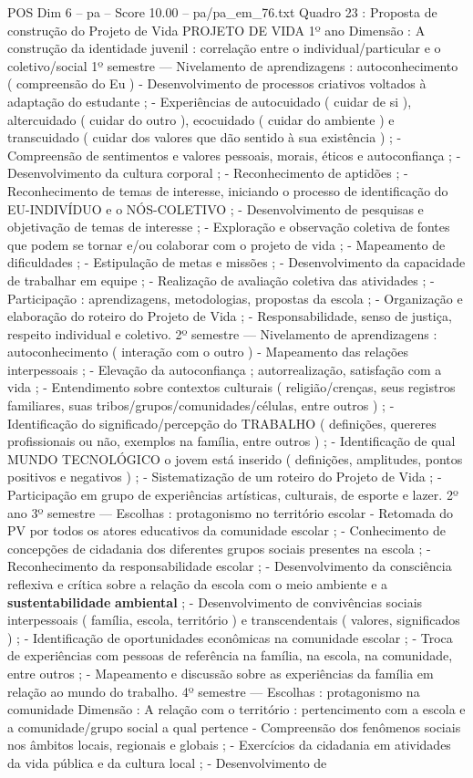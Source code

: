 \begin{textsample}{POS Dim 6 – pa – Score 10.00 – pa/pa\_em\_76.txt}
Quadro 23 : Proposta de construção do Projeto de Vida PROJETO DE VIDA 1º ano Dimensão : A construção da identidade juvenil : correlação entre o individual/particular e o coletivo/social 1º semestre — Nivelamento de aprendizagens : autoconhecimento ( compreensão do Eu ) - Desenvolvimento de processos criativos voltados à adaptação do estudante ; - Experiências de autocuidado ( cuidar de si ), altercuidado ( cuidar do outro ), ecocuidado ( cuidar do ambiente ) e transcuidado ( cuidar dos valores que dão sentido à sua existência ) ; - Compreensão de sentimentos e valores pessoais, morais, éticos e autoconfiança ; - Desenvolvimento da cultura corporal ; - Reconhecimento de aptidões ; - Reconhecimento de temas de interesse, iniciando o processo de identificação do EU-INDIVÍDUO e o NÓS-COLETIVO ; - Desenvolvimento de pesquisas e objetivação de temas de interesse ; - Exploração e observação coletiva de fontes que podem se tornar e/ou colaborar com o projeto de vida ; - Mapeamento de dificuldades ; - Estipulação de metas e missões ; - Desenvolvimento da capacidade de trabalhar em equipe ; - Realização de avaliação coletiva das atividades ; - Participação : aprendizagens, metodologias, propostas da escola ; - Organização e elaboração do roteiro do Projeto de Vida ; - Responsabilidade, senso de justiça, respeito individual e coletivo. 2º semestre — Nivelamento de aprendizagens : autoconhecimento ( interação com o outro ) - Mapeamento das relações interpessoais ; - Elevação da autoconfiança ; autorrealização, satisfação com a vida ; - Entendimento sobre contextos culturais ( religião/crenças, seus registros familiares, suas tribos/grupos/comunidades/células, entre outros ) ; - Identificação do significado/percepção do TRABALHO ( definições, quereres profissionais ou não, exemplos na família, entre outros ) ; - Identificação de qual MUNDO TECNOLÓGICO o jovem está inserido ( definições, amplitudes, pontos positivos e negativos ) ; - Sistematização de um roteiro do Projeto de Vida ; - Participação em grupo de experiências artísticas, culturais, de esporte e lazer. 2º ano 3º semestre — Escolhas : protagonismo no território escolar - Retomada do PV por todos os atores educativos da comunidade escolar ; - Conhecimento de concepções de cidadania dos diferentes grupos sociais presentes na escola ; - Reconhecimento da responsabilidade escolar ; - Desenvolvimento da consciência reflexiva e crítica sobre a relação da escola com o meio ambiente e a \textbf{sustentabilidade} \textbf{ambiental} ; - Desenvolvimento de convivências sociais interpessoais ( família, escola, território ) e transcendentais ( valores, significados ) ; - Identificação de oportunidades econômicas na comunidade escolar ; - Troca de experiências com pessoas de referência na família, na escola, na comunidade, entre outros ; - Mapeamento e discussão sobre as experiências da família em relação ao mundo do trabalho. 4º semestre — Escolhas : protagonismo na comunidade Dimensão : A relação com o território : pertencimento com a escola e a comunidade/grupo social a qual pertence - Compreensão dos fenômenos sociais nos âmbitos locais, regionais e globais ; - Exercícios da cidadania em atividades da vida pública e da cultura local ; - Desenvolvimento de 
\end{textsample}
